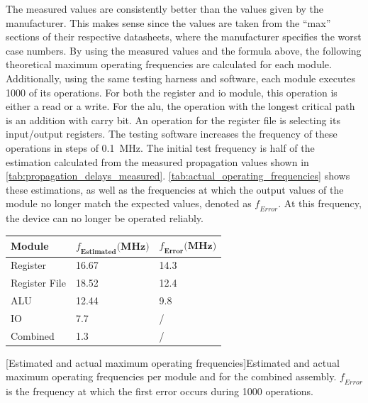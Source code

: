 The measured values are consistently better than the values given by the manufacturer. This makes sense since the values are taken from the ``max'' sections of their respective datasheets, where the manufacturer specifies the worst case numbers. By using the measured values and the formula above, the following theoretical maximum operating frequencies are calculated for each module. Additionally, using the same testing harness and software, each module executes 1000 of its operations. For both the register and \ac{io} module, this operation is either a read or a write. For the \ac{alu}, the operation with the longest critical path is an addition with carry bit. An operation for the register file is selecting its input/output registers. The testing software increases the frequency of these operations in steps of \SI{0.1}{\mega\hertz}. The initial test frequency is half of the estimation calculated from the measured propagation values shown in \autoref{tab:propagation_delays_measured}. \autoref{tab:actual_operating_frequencies} shows these estimations, as well as the frequencies at which the output values of the module no longer match the expected values, denoted as $\mathit{f}_{Error}$. At this frequency, the device can no longer be operated reliably. 

\begin{table}[H]
    \centering
    \begin{tabular}{|l|l|l|} 
    \hline
    \textbf{Module} & $\bm{\mathit{f}_{Estimated}\text{(MHz)}}$ & $\bm{\mathit{f}_{Error}\text{(MHz)}}$  \\ 
    \hline
    Register        & 16.67                             & 14.3                            \\ 
    \hline
    Register File   & 18.52                             & 12.4                            \\ 
    \hline
    ALU             & 12.44                             & 9.8                             \\ 
    \hline
    IO              & 7.7                               & /                               \\ 
    \hline
    Combined        & 1.3                               & /                               \\
    \hline
    \end{tabular}
    \label{tab:actual_operating_frequencies}
    [Estimated and actual maximum operating frequencies]{Estimated and actual maximum operating frequencies per module and for the combined assembly. $\mathit{f}_{Error}$ is the frequency at which the first error occurs during 1000 operations.}
\end{table}

